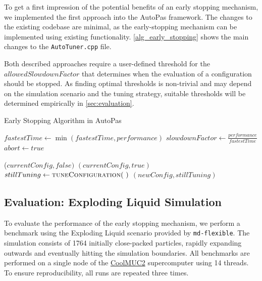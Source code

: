\documentclass[conference]{IEEEtran}
\begin{document}
To get a first impression of the potential benefits of an early stopping mechanism, we implemented the first approach into the AutoPas framework. The changes to the existing codebase are minimal, as the early-stopping mechanism can be implemented using existing functionality. \autoref{alg_early_stopping} shows the main changes to the \texttt{AutoTuner.cpp} file.

Both described approaches require a user-defined threshold for the $allowedSlowdownFactor$ that determines when the evaluation of a configuration should be stopped. As finding optimal thresholds is non-trivial and may depend on the simulation scenario and the tuning strategy, suitable thresholds will be determined empirically in \autoref{sec:evaluation}.

\begin{algorithm}[h]
    \small
    \caption{Early Stopping Algorithm in AutoPas}
    \label{alg_early_stopping}
    \begin{algorithmic}[1]
        \State $fastestTime \gets \min(fastestTime, performance)$
        \State $slowdownFactor \gets \frac{performance}{fastestTime}$
        \State $abort \gets true$
        \EndIf
        \EndProcedure

        \vspace{0.5em}

        \State \Return ($currentConfig, false)$
            \State \Return $(currentConfig, true)$
            \Else
            \State $stillTuning \gets \Call{tuneConfiguration}{~}$
            \State \Return $(newConfig, stillTuning)$
        \EndIf
        \EndProcedure
    \end{algorithmic}
\end{algorithm}

\subsection{Evaluation: Exploding Liquid Simulation}
\label{sec:evaluation}

To evaluate the performance of the early stopping mechanism, we perform a benchmark using the Exploding Liquid scenario provided by \texttt{md-flexible}. The simulation consists of 1764 initially close-packed particles, rapidly expanding outwards and eventually hitting the simulation boundaries. All benchmarks are performed on a single node of the \href{https://doku.lrz.de/coolmuc-2-11484376.html}{CoolMUC2} supercomputer using 14 threads. To ensure reproducibility, all runs are repeated three times.
\end{document}
